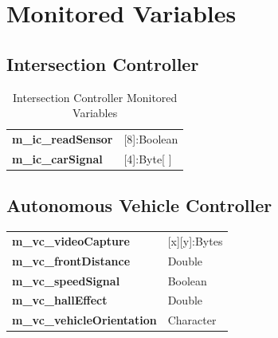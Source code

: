\documentclass [10pt]{article}
\begin{document}
%




\section{Monitored Variables}

\subsection{Intersection Controller}

\begin{longtable}{ |p{ }  p{ }|}\caption{Intersection Controller Monitored Variables} \\   \hline
\textbf{m\_ic\_readSensor} & [8]:Boolean  \\

\cellcolor{tableCell}\textbf{m\_ic\_carSignal}  & \cellcolor{tableCell}[4]:Byte[ ] \\  \hline
\end{longtable}

\subsection{Autonomous Vehicle Controller}

\begin{longtable}{ |p{ }  p{ }|}  \hline
\textbf{m\_vc\_videoCapture} & [x][y]:Bytes  \\ 

\cellcolor{tableCell}\textbf{m\_vc\_frontDistance}  & \cellcolor{tableCell}Double \\ 


\textbf{m\_vc\_speedSignal} & Boolean \\

\cellcolor{tableCell}\textbf{m\_vc\_hallEffect}  & \cellcolor{tableCell}Double \\ 

\textbf{m\_vc\_vehicleOrientation} & Character \\\hline
\end{longtable}


\end{document}
